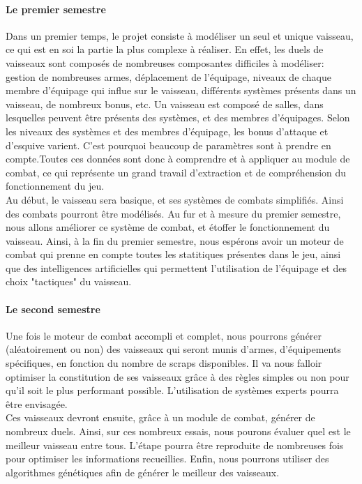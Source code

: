 	\paragraph{Le premier semestre}
	
	Dans un premier temps, le projet consiste à modéliser un seul et unique vaisseau, ce qui est en soi la partie la plus complexe à réaliser. En effet, les duels de vaisseaux sont composés de nombreuses composantes difficiles à modéliser: gestion de nombreuses armes, déplacement de l'équipage, niveaux de chaque membre d'équipage qui influe sur le vaisseau, différents systèmes présents dans un vaisseau, de nombreux bonus, etc. Un vaisseau est composé de salles, dans lesquelles peuvent être présents des systèmes, et des membres d'équipages. Selon les niveaux des systèmes et des membres d'équipage, les bonus d'attaque et d'esquive varient. C'est pourquoi beaucoup de paramètres sont à prendre en compte.Toutes ces données sont donc à comprendre et à appliquer au module de combat, ce qui représente un grand travail d'extraction et de compréhension du fonctionnement du jeu.
	\\
	Au début, le vaisseau sera basique, et ses systèmes de combats simplifiés. Ainsi des combats pourront être modélisés. Au fur et à mesure du premier semestre, nous allons améliorer ce système de combat, et étoffer le fonctionnement du vaisseau. Ainsi, à la fin du premier semestre, nous espérons avoir un moteur de combat qui prenne en compte toutes les statitiques présentes dans le jeu, ainsi que des intelligences artificielles qui permettent l'utilisation de l'équipage et des choix "tactiques" du vaisseau.
	
	\paragraph{Le second semestre}
	
	Une fois le moteur de combat accompli et complet, nous pourrons générer (aléatoirement ou non) des vaisseaux qui seront munis d'armes, d'équipements spécifiques, en fonction du nombre de scraps disponibles. Il va nous falloir optimiser la constitution de ses vaisseaux grâce à des règles simples ou non pour qu'il soit le plus performant possible. L'utilisation de systèmes experts pourra être envisagée.\\
	Ces vaisseaux devront ensuite, grâce à un module de combat, générer de nombreux duels. Ainsi, sur ces nombreux essais, nous pourons évaluer quel est le meilleur vaisseau entre tous. L'étape pourra être reproduite de nombreuses fois pour optimiser les informations recueillies. Enfin, nous pourrons utiliser des algorithmes génétiques afin de générer le meilleur des vaisseaux. 
	
